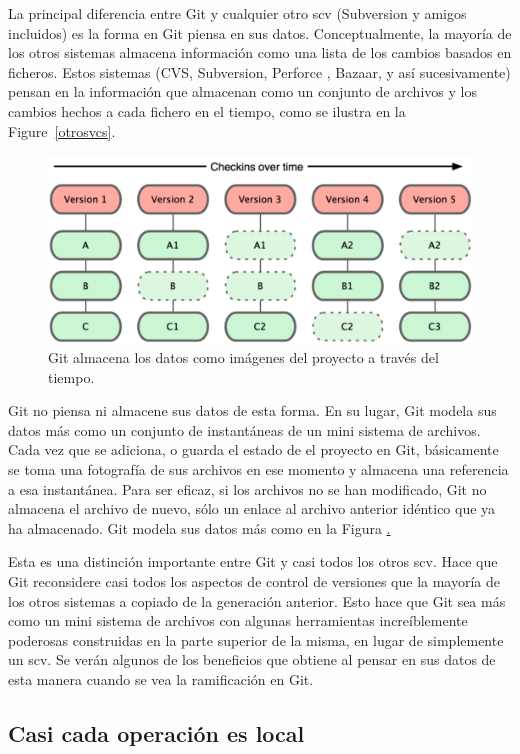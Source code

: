 \documentclass[12pt, spanish, oneside, onecolumn, a4paper]{report}
\begin{document}
La principal diferencia entre Git y cualquier otro \gls{scv} (Subversion y amigos incluidos) es la forma en Git piensa en sus datos. Conceptualmente, la mayoría de los otros sistemas almacena información como una lista de los cambios basados en ficheros. Estos sistemas (CVS, Subversion, Perforce , Bazaar, y así sucesivamente) pensan en la información que almacenan como un conjunto de archivos y los cambios hechos a cada fichero en el tiempo, como se ilustra en la Figure~\ref{otrosvcs}.


\begin{figure}
  \begin{center}
  \includegraphics[width=.6\textwidth,keepaspectratio=true]{18333fig0105-tn.png}
  \end{center}
  \caption{Git almacena los datos como imágenes del proyecto a través del tiempo.}
  \label{gitsnapshot}
\end{figure}
Git no piensa ni almacene sus datos de esta forma. En su lugar, Git modela sus datos más como un conjunto de instantáneas de un mini
sistema de archivos. Cada vez que se adiciona, o guarda el estado de el proyecto en Git, básicamente se toma una fotografía de sus archivos en ese momento y almacena una referencia a esa instantánea. Para ser eficaz, si los archivos no se han modificado, Git no almacena el archivo de nuevo, sólo un enlace al archivo anterior idéntico que ya ha almacenado. Git modela sus datos más como en la Figura \href{gitsnapshot}.

Esta es una distinción importante entre Git y casi todos los otros \gls{scv}. Hace que Git reconsidere casi todos los aspectos de control de versiones que la mayoría de los otros sistemas a copiado de la generación anterior. Esto hace que Git sea más como un mini sistema de archivos con algunas herramientas increíblemente poderosas construidas en la parte superior de la misma, en lugar de simplemente un \gls{scv}. Se verán algunos de los beneficios que obtiene al pensar en sus datos de esta manera cuando se vea la ramificación en Git.

\subsection{Casi cada operación es local}
\label{sec:almostlocal}
\end{document}
